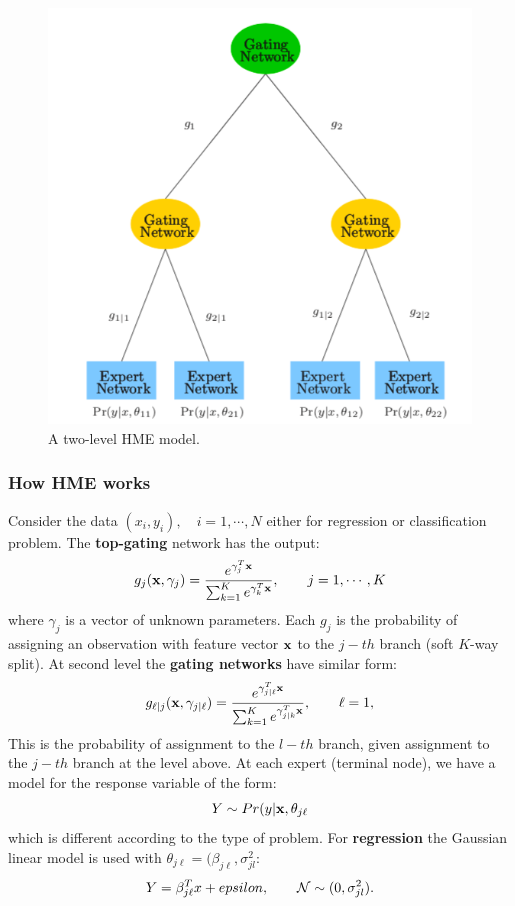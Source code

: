 \begin{figure}
\centering
\includegraphics[scale=0.5]{img/HME}
\caption{A two-level HME model.}
\end{figure}
\subsubsection{How HME works}
Consider the data $(x_i, y_i), \quad i=1,\cdots, N$ either for regression or classification problem. The \textbf{top-gating} network has the output:
\begin{equation}
g_j(\mathbf{x}, \gamma_j) = \frac{e^{\gamma_j^T\mathbf{x}}}{\sum_{k=1}^Ke^{\gamma_k^T\mathbf{x}}}, \quad\quad j=1,\cdots, K
\end{equation}
where $\gamma_j$ is a vector of unknown parameters. Each $g_j$ is the probability of assigning an observation with feature vector $\mathbf{x}$ to the $j-th$ branch (soft $K$-way split). At second level the \textbf{gating networks} have similar form:
\begin{equation}
g_{\ell|j}(\mathbf{x}, \gamma_{j|\ell}) = \frac{e^{\gamma_{j|\ell}^T\mathbf{x}}}{\sum_{k=1}^Ke^{\gamma_{j|k}^T\mathbf{x}}}, \quad\quad \ell=1,
\end{equation}
This is the probability of assignment to the $l-th$ branch, given assignment to the $j-th$ branch at the level above. At each expert (terminal node), we have a model for the response variable of the form:
\begin{equation}
Y \sim Pr(y|\mathbf{x}, \theta_{j\ell}
\end{equation}
which is different according to the type of problem. For \textbf{regression} the Gaussian linear model is used with $\theta_{j\ell} = (\beta_{j\ell},\sigma^2_{jl}$:
\begin{equation}
Y = \beta_{j\ell}^Tx + epsilon, \quad\quad \CMcal{N} \sim(0,\sigma^2_{jl}). 
\end{equation}

